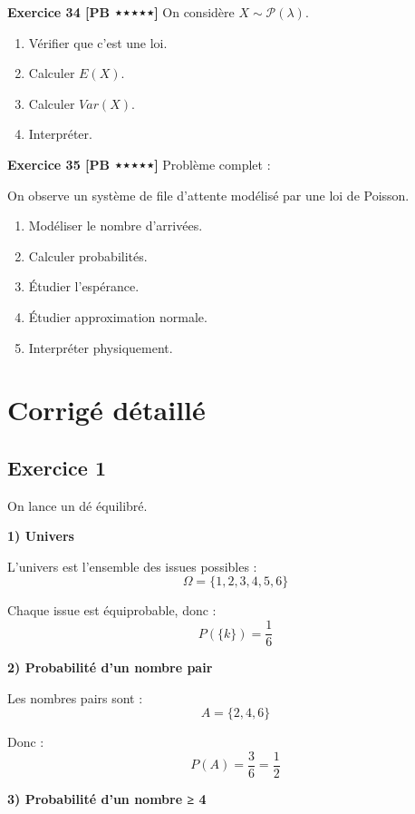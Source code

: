 \documentclass[11pt,a4paper]{article}
\begin{document}
\textbf{Exercice 34 [PB ⋆⋆⋆⋆⋆]}  
On considère $X \sim \mathcal{P}(\lambda)$.

\begin{enumerate}
\item Vérifier que c’est une loi.
\item Calculer $E(X)$.
\item Calculer $Var(X)$.
\item Interpréter.
\end{enumerate}

\textbf{Exercice 35 [PB ⋆⋆⋆⋆⋆]}  
Problème complet :

On observe un système de file d’attente modélisé par une loi de Poisson.

\begin{enumerate}
\item Modéliser le nombre d’arrivées.
\item Calculer probabilités.
\item Étudier l’espérance.
\item Étudier approximation normale.
\item Interpréter physiquement.
\end{enumerate}

\newpage
\section{Corrigé détaillé}

\subsection*{Exercice 1}

On lance un dé équilibré.

\textbf{1) Univers}

L’univers est l’ensemble des issues possibles :
\[
\Omega = \{1,2,3,4,5,6\}
\]

Chaque issue est équiprobable, donc :
\[
P(\{k\}) = \frac{1}{6}
\]

\textbf{2) Probabilité d’un nombre pair}

Les nombres pairs sont :
\[
A = \{2,4,6\}
\]

Donc :
\[
P(A) = \frac{3}{6} = \frac{1}{2}
\]

\textbf{3) Probabilité d’un nombre ≥ 4}
\end{document}
